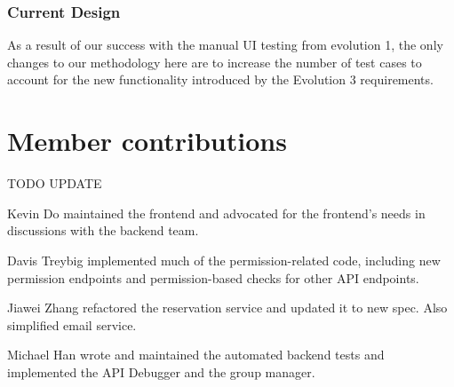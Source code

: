 \documentclass[12pt]{article}
\begin{document}
\subsubsection{Current Design}
As a result of our success with the manual UI testing from evolution 1, the only changes to our methodology here are to increase the number of test cases to account for the new functionality introduced by the Evolution 3 requirements.

\section{Member contributions}
{\huge TODO UPDATE}

Kevin Do maintained the frontend and advocated for the frontend's needs in discussions with the backend team.

Davis Treybig implemented much of the permission-related code, including new permission endpoints and permission-based checks for other API endpoints. 

Jiawei Zhang refactored the reservation service and updated it to new spec. Also simplified email service.

Michael Han wrote and maintained the automated backend tests and implemented the API Debugger and the group manager.

\clearpage
\appendix
\end{document}
